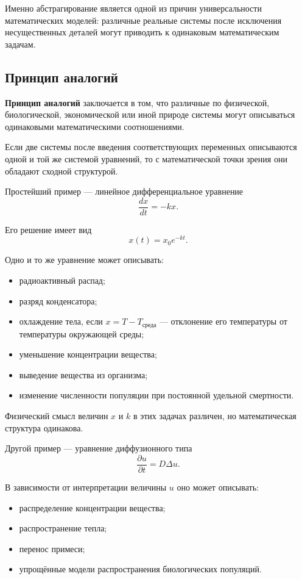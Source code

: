 Именно абстрагирование является одной из причин универсальности математических моделей: различные реальные системы после исключения несущественных деталей могут приводить к одинаковым математическим задачам.

\subsection{Принцип аналогий}

\textbf{Принцип аналогий} заключается в том, что различные по физической, биологической, экономической или иной природе системы могут описываться одинаковыми математическими соотношениями.

Если две системы после введения соответствующих переменных описываются одной и той же системой уравнений, то с математической точки зрения они обладают сходной структурой.

Простейший пример --- линейное дифференциальное уравнение
\[
\frac{dx}{dt} = -kx.
\]

Его решение имеет вид
\[
x(t) = x_0 e^{-kt}.
\]

Одно и то же уравнение может описывать:
\begin{itemize}
	\item радиоактивный распад;
	\item разряд конденсатора;
	\item охлаждение тела, если $x=T-T_{\text{среда}}$ --- отклонение его температуры от температуры окружающей среды;
	\item уменьшение концентрации вещества;
	\item выведение вещества из организма;
	\item изменение численности популяции при постоянной удельной смертности.
\end{itemize}

Физический смысл величин $x$ и $k$ в этих задачах различен, но математическая структура одинакова.

Другой пример --- уравнение диффузионного типа
\[
\frac{\partial u}{\partial t}
=
D\Delta u.
\]

В зависимости от интерпретации величины $u$ оно может описывать:
\begin{itemize}
	\item распределение концентрации вещества;
	\item распространение тепла;
	\item перенос примеси;
	\item упрощённые модели распространения биологических популяций.
\end{itemize}

